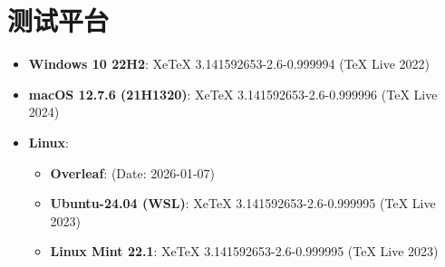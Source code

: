 \section{测试平台}

\begin{itemize}[nosep]
  \item \textbf{Windows 10 22H2}: XeTeX 3.141592653-2.6-0.999994 (TeX Live 2022)
  \item \textbf{macOS 12.7.6 (21H1320)}: XeTeX 3.141592653-2.6-0.999996 (TeX Live 2024)
  \item \textbf{Linux}:
    \begin{itemize}[nosep]
      \item \textbf{Overleaf}: (Date: 2026-01-07)
      \item \textbf{Ubuntu-24.04 (WSL)}: XeTeX 3.141592653-2.6-0.999995 (TeX Live 2023)
      \item \textbf{Linux Mint 22.1}: XeTeX 3.141592653-2.6-0.999995 (TeX Live 2023)
    \end{itemize}
\end{itemize}